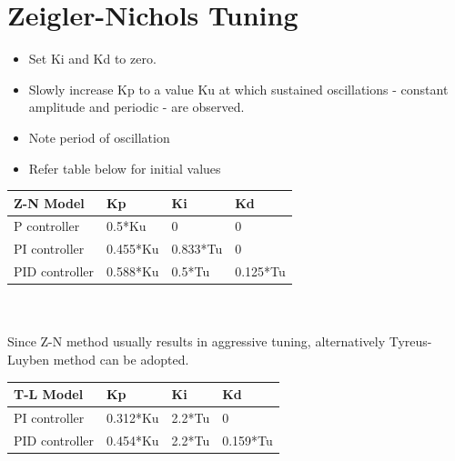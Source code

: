 \documentclass[a4paper,10pt]{article}
\begin{document}
\appendices
\section{Zeigler-Nichols Tuning}
\begin{itemize}
\item Set Ki and Kd to zero.
\item Slowly increase Kp to a value Ku at which sustained oscillations - constant amplitude and periodic - are observed.
\item Note period of oscillation
\item Refer table below for initial values
\end{itemize}

\begin{tabular}{|l|l|l|l|}
\hline
       Z-N Model      & Kp       & Ki       & Kd       \\      
\hline
       P controller   & 0.5*Ku   & 0        & 0        \\
\hline
       PI controller  & 0.455*Ku & 0.833*Tu & 0        \\
\hline
       PID controller & 0.588*Ku & 0.5*Tu   & 0.125*Tu \\
\hline
\end{tabular}
\\
\\
Since Z-N method usually results in aggressive tuning, alternatively Tyreus-Luyben method can be adopted.
\\
\begin{tabular}{|l|l|l|l|}
\hline
       T-L Model      & Kp       & Ki     & Kd       \\
\hline
       PI controller  & 0.312*Ku & 2.2*Tu & 0        \\
\hline
       PID controller & 0.454*Ku & 2.2*Tu & 0.159*Tu \\
\hline
\end{tabular}
\end{document}
